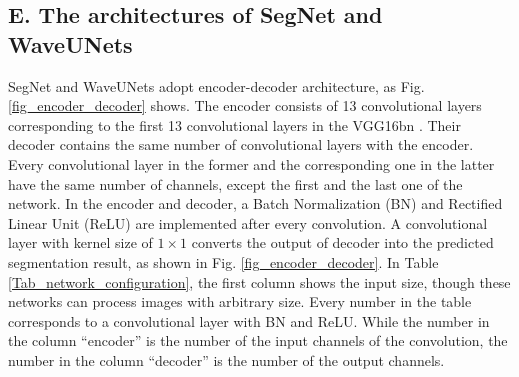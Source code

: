 \subsection*{E. The architectures of SegNet and WaveUNets}
SegNet and WaveUNets adopt encoder-decoder architecture, as Fig. \ref{fig_encoder_decoder} shows.
The encoder consists of 13 convolutional layers
corresponding to the first 13 convolutional layers in the VGG16bn \cite{simonyan2014very}.
Their decoder contains the same number of convolutional layers with the encoder.
Every convolutional layer in the former and the corresponding one in the latter have the same number of channels,
except the first and the last one of the network.
In the encoder and decoder, a Batch Normalization (BN) and Rectified Linear Unit (ReLU) are implemented after every convolution.
A convolutional layer with kernel size of $1\times1$ converts the output of decoder into the predicted segmentation result,
as shown in Fig. \ref{fig_encoder_decoder}.
In Table \ref{Tab_network_configuration}, the first column shows the input size,
though these networks can process images with arbitrary size.
Every number in the table corresponds to a convolutional layer with BN and ReLU.
While the number in the column ``encoder'' is the number of the input channels of the convolution,
the number in the column ``decoder'' is the number of the output channels.
\begin{table}[!t]
	\caption{Deep network configurations.}
	\label{Tab_network_configuration}
	\begin{center}
	\begin{threeparttable}
	\end{threeparttable}
	\end{center}
\end{table}


